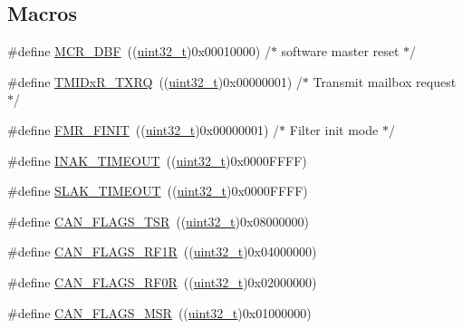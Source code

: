\subsection*{Macros}
\begin{DoxyCompactItemize}
\item 
\#define \hyperlink{group___c_a_n___private___defines_ga1ded3736beb63c49281f2983fc68c36d}{M\+C\+R\+\_\+\+D\+BF}~((\hyperlink{_p_e___types_8h_a33594304e786b158f3fb30289278f5af}{uint32\+\_\+t})0x00010000) /$\ast$ software master reset $\ast$/
\item 
\#define \hyperlink{group___c_a_n___private___defines_gabeb6db5ba5c01da5084ec1605f868e18}{T\+M\+I\+Dx\+R\+\_\+\+T\+X\+RQ}~((\hyperlink{_p_e___types_8h_a33594304e786b158f3fb30289278f5af}{uint32\+\_\+t})0x00000001) /$\ast$ Transmit mailbox request $\ast$/
\item 
\#define \hyperlink{group___c_a_n___private___defines_ga6125d0273c466e402db1a8f5bf888857}{F\+M\+R\+\_\+\+F\+I\+N\+IT}~((\hyperlink{_p_e___types_8h_a33594304e786b158f3fb30289278f5af}{uint32\+\_\+t})0x00000001) /$\ast$ Filter init mode $\ast$/
\item 
\#define \hyperlink{group___c_a_n___private___defines_ga60a32132df242146efd3e9f7a079f0f0}{I\+N\+A\+K\+\_\+\+T\+I\+M\+E\+O\+UT}~((\hyperlink{_p_e___types_8h_a33594304e786b158f3fb30289278f5af}{uint32\+\_\+t})0x0000\+F\+F\+F\+F)
\item 
\#define \hyperlink{group___c_a_n___private___defines_ga1bb8107706c8b4039ac55a122f3c65bb}{S\+L\+A\+K\+\_\+\+T\+I\+M\+E\+O\+UT}~((\hyperlink{_p_e___types_8h_a33594304e786b158f3fb30289278f5af}{uint32\+\_\+t})0x0000\+F\+F\+F\+F)
\item 
\#define \hyperlink{group___c_a_n___private___defines_gac67e7d905ba11441bf9e14180805cf3a}{C\+A\+N\+\_\+\+F\+L\+A\+G\+S\+\_\+\+T\+SR}~((\hyperlink{_p_e___types_8h_a33594304e786b158f3fb30289278f5af}{uint32\+\_\+t})0x08000000)
\item 
\#define \hyperlink{group___c_a_n___private___defines_ga2a03d73273ab353c8deb3a4730431977}{C\+A\+N\+\_\+\+F\+L\+A\+G\+S\+\_\+\+R\+F1R}~((\hyperlink{_p_e___types_8h_a33594304e786b158f3fb30289278f5af}{uint32\+\_\+t})0x04000000)
\item 
\#define \hyperlink{group___c_a_n___private___defines_ga4b22b2552759778ac07825240823a45f}{C\+A\+N\+\_\+\+F\+L\+A\+G\+S\+\_\+\+R\+F0R}~((\hyperlink{_p_e___types_8h_a33594304e786b158f3fb30289278f5af}{uint32\+\_\+t})0x02000000)
\item 
\#define \hyperlink{group___c_a_n___private___defines_ga3aaa7df395ce1a90cb6e2ff3d2c4b24e}{C\+A\+N\+\_\+\+F\+L\+A\+G\+S\+\_\+\+M\+SR}~((\hyperlink{_p_e___types_8h_a33594304e786b158f3fb30289278f5af}{uint32\+\_\+t})0x01000000)

\end{DoxyCompactItemize}
